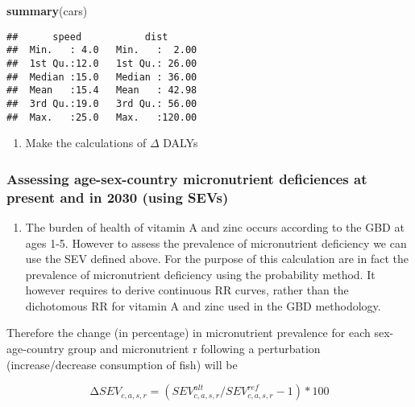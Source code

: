 \documentclass[
]{article}
\newenvironment{Shaded}{\begin{snugshade}}{\end{snugshade}}
\newcommand{\KeywordTok}[1]{\textcolor[rgb]{0.13,0.29,0.53}{\textbf{#1}}}
\newcommand{\NormalTok}[1]{#1}
\providecommand{\tightlist}{%
  \setlength{\itemsep}{0pt}\setlength{\parskip}{0pt}}
\begin{document}
\begin{Shaded}
\begin{Highlighting}[]
\KeywordTok{summary}\NormalTok{(cars)}
\end{Highlighting}
\end{Shaded}

\begin{verbatim}
##      speed           dist       
##  Min.   : 4.0   Min.   :  2.00  
##  1st Qu.:12.0   1st Qu.: 26.00  
##  Median :15.0   Median : 36.00  
##  Mean   :15.4   Mean   : 42.98  
##  3rd Qu.:19.0   3rd Qu.: 56.00  
##  Max.   :25.0   Max.   :120.00
\end{verbatim}

\begin{enumerate}
\def\labelenumi{\arabic{enumi}.}
\setcounter{enumi}{1}
\tightlist
\item
  Make the calculations of \(\Delta\) DALYs
\end{enumerate}

\hypertarget{assessing-age-sex-country-micronutrient-deficiences-at-present-and-in-2030-using-sevs}{%
\subsubsection{Assessing age-sex-country micronutrient deficiences at
present and in 2030 (using
SEVs)}\label{assessing-age-sex-country-micronutrient-deficiences-at-present-and-in-2030-using-sevs}}

\begin{enumerate}
\def\labelenumi{\arabic{enumi}.}
\tightlist
\item
  The burden of health of vitamin A and zinc occurs according to the GBD
  at ages 1-5. However to assess the prevalence of micronutrient
  deficiency we can use the SEV defined above. For the purpose of this
  calculation are in fact the prevalence of micronutrient deficiency
  using the probability method. It however requires to derive continuous
  RR curves, rather than the dichotomous RR for vitamin A and zinc used
  in the GBD methodology.
\end{enumerate}

Therefore the change (in percentage) in micronutrient prevalence for
each sex-age-country group and micronutrient r following a perturbation
(increase/decrease consumption of fish) will be

\[
                                    ∆SEV_{c,a,s,r}=(SEV^{alt}_{c,a,s,r}/SEV^{ref}_{c,a,s,r}-1)*100
                                    \]
\end{document}
